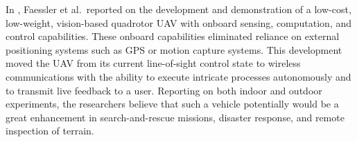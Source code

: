 In \cite{Faessler2016}, Faessler et al.\ reported on the development and demonstration of a low-cost, low-weight, vision-based quadrotor UAV with onboard sensing, computation, and control capabilities. These onboard capabilities eliminated reliance on external positioning systems such as GPS or motion capture systems. This development moved the UAV from its current line-of-sight control state to wireless communications with the ability to execute intricate processes autonomously and to transmit live feedback to a user. Reporting on both indoor and outdoor experiments, the researchers believe that such a vehicle potentially would be a great enhancement in search-and-rescue missions, disaster response, and remote inspection of terrain. 
